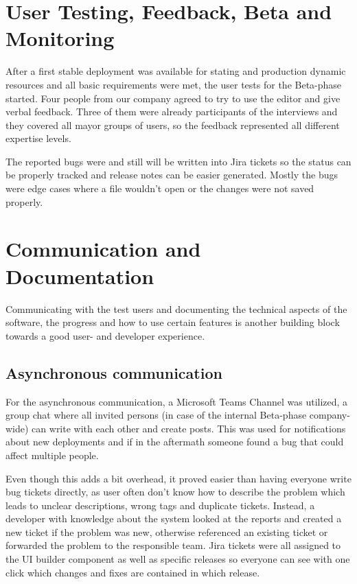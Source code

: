\section{User Testing, Feedback, Beta and Monitoring}

After a first stable deployment was available for stating and production dynamic resources and all basic requirements were met, the user tests for the Beta-phase started.
Four people from our company agreed to try to use the editor and give verbal feedback. Three of them were already participants of the interviews and they covered all mayor groups of users,
so the feedback represented all different expertise levels.

The reported bugs were and still will be written into Jira tickets so the status can be properly tracked and release notes can be easier generated.
Mostly the bugs were edge cases where a file wouldn't open or the changes were not saved properly.


\section{Communication and Documentation}
Communicating with the test users and documenting the technical aspects of the software, the progress and how to use certain features is
another building block towards a good user- and developer experience.
\subsection{Asynchronous communication}
For the asynchronous communication, a Microsoft Teams Channel was utilized, a group chat where all invited persons (in case of the internal Beta-phase company-wide) can write with each other and create posts.
This was used for notifications about new deployments and if in the aftermath someone found a bug that could affect multiple people.

Even though this adds a bit overhead, it proved easier than having everyone write bug tickets directly, as user often don't know how to describe the problem which leads to unclear descriptions, wrong tags and duplicate tickets.
Instead, a developer with knowledge about the system looked at the reports and created a new ticket if the problem was new, otherwise referenced an existing ticket or forwarded the problem to the responsible team.
Jira tickets were all assigned to the UI builder component as well as specific releases so everyone can see with one click which changes and fixes are contained in which release.


